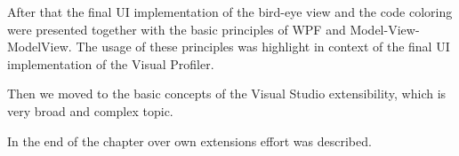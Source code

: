 After that the final UI implementation of the bird-eye view and the code coloring were presented together with the basic principles of WPF and Model-View-ModelView. The usage of these principles was highlight in context of the final UI implementation of the Visual Profiler.

Then we moved to the basic concepts of the Visual Studio extensibility, which is very broad and complex topic.

In the end of the chapter over own extensions effort was described.











